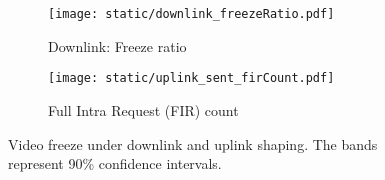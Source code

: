 \begin{figure}[t]
    \centering
    \begin{subfigure}[t]{0.45\textwidth}      
        \texttt{[image: static/downlink\_freezeRatio.pdf]}
        \caption{Downlink: Freeze ratio}
 		\label{subfig:downlink_freeze_ratio}
    \end{subfigure}
	\begin{subfigure}[t]{0.45\textwidth}   
        \centering
        \texttt{[image: static/uplink\_sent\_firCount.pdf]}
    \caption{Full Intra Request (FIR) count}
    \label{subfig:uplink_fir}
    \end{subfigure}%
	\caption{Video freeze under downlink and uplink shaping. The bands represent 90\% confidence intervals.}
	\label{fig:video_freeze}
\end{figure}







